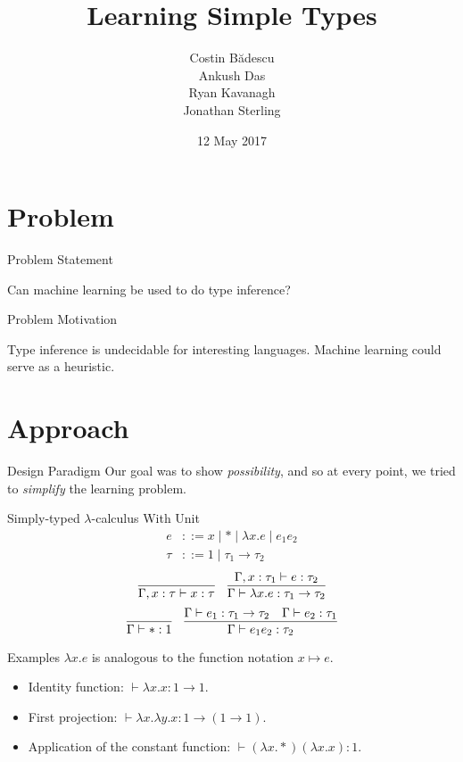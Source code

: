 \documentclass[17pt]{beamer}
\title{Learning Simple Types}
\date{12 May 2017}
\author{Costin B\u{a}descu\\Ankush Das\\Ryan Kavanagh\\Jonathan Sterling}
\institute{15-780 Class Project, Carnegie Mellon University}
\begin{document}
\maketitle

\section{Problem}

\begin{frame}{Problem Statement}
  \begin{center}
    Can machine learning be used to do type inference?
  \end{center}
\end{frame}

\begin{frame}{Problem Motivation}
  \begin{center}
    Type inference is undecidable for interesting languages. Machine
    learning could serve as a heuristic.
  \end{center}
\end{frame}

\section{Approach}

\begin{frame}{Design Paradigm}
  Our goal was to show \textit{possibility}, and so at every point, we
  tried to \textit{simplify} the learning problem.
\end{frame}

\begin{frame}{Simply-typed $\lambda$-calculus With Unit}
  \begin{align*}
    e &::= x \mid * \mid \lambda x.e \mid e_1e_2\\
    \tau &::= 1 \mid \tau_1 \to \tau_2
  \end{align*}
  \[\infer{\Gamma, x:\tau \vdash x : \tau}{}\quad
    \infer{\Gamma \vdash \lambda x.e : \tau_1 \to
      \tau_2}{\Gamma,x:\tau_1 \vdash e : \tau_2} \]
  \[ \infer{\Gamma \vdash * : 1}{}\quad \infer{\Gamma \vdash e_1e_2 :
      \tau_2}{\Gamma \vdash e_1 : \tau_1 \to \tau_2 & \Gamma \vdash
      e_2 : \tau_1} \]
\end{frame}

\begin{frame}{Examples}
  $\lambda x.e$ is analogous to the function notation $x \mapsto e$.
  \begin{itemize}
  \item Identity function: $\vdash \lambda x . x : 1 \to 1$.
  \item First projection: $\vdash \lambda x. \lambda y. x : 1 \to (1 \to 1)$.
  \item Application of the constant function:
    $\vdash (\lambda x . *)(\lambda x. x) : 1$.
  \end{itemize}
\end{frame}
\end{document}
